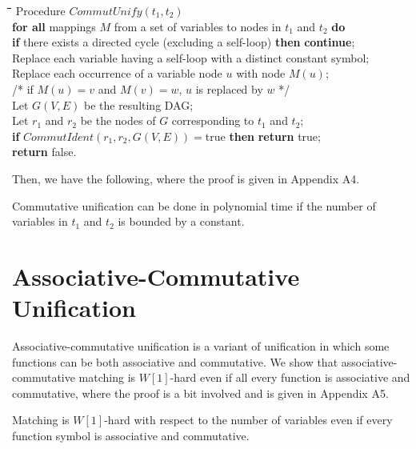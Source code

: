 \documentclass[a4paper]{llncs}
\begin{document}
\begin{rm}
\begin{tabbing}
\quad \= \quad \= \quad \= \quad \= \quad \= \quad \= \quad \= \kill
\> Procedure $CommutUnify(t_1,t_2)$\\
\> \> {\bf for all} mappings $M$ from a set of variables to nodes in $t_1$ and $t_2$ {\bf do} \\
\> \> \> {\bf if} there exists a directed cycle (excluding a self-loop) {\bf then} {\bf continue};\\
\> \> \> Replace each variable having a self-loop with a distinct constant symbol;\\
\> \> \> Replace each occurrence of a variable node $u$ with node $M(u)$;\\
\> \> \> \> \> \> /* if  $M(u)=v$ and $M(v)=w$, $u$ is replaced by $w$ */\\ 
\> \> \> Let $G(V,E)$ be the resulting DAG;\\
\> \> \> Let $r_1$ and $r_2$ be the nodes of $G$ corresponding to $t_1$ and $t_2$;\\
\> \> \> {\bf if} $CommutIdent(r_1,r_2,G(V,E))=$true {\bf then} {\bf return} true;\\
\> \> {\bf return} false.
\end{tabbing}
\end{rm}

\noindent
Then, we have the following, where the proof is given in Appendix A4.

\begin{theorem}
Commutative unification can be done in polynomial time
if the number of variables in $t_1$ and $t_2$ is 
bounded by a constant.
\label{thm:com-unif-poly}
\end{theorem}

\section{Associative-Commutative Unification}

Associative-commutative unification is a variant of unification
in which some functions can be both associative and commutative.
We show that associative-commutative matching is
$W[1]$-hard even if all every function is associative and commutative,
where the proof is a bit involved and is given in Appendix A5.

\begin{theorem}
Matching is $W[1]$-hard with respect to the number of variables
even if every function symbol is associative and commutative.
\label{thm:ac-hard}
\end{theorem}
\end{document}
